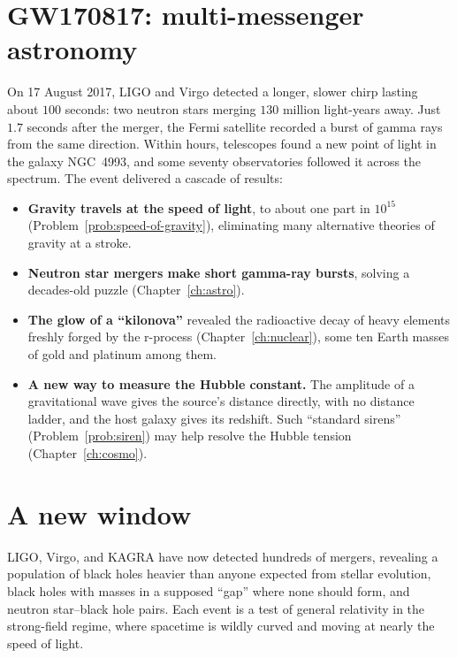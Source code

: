 \section{GW170817: multi-messenger astronomy}

On 17 August 2017, LIGO and Virgo detected a longer, slower chirp lasting about $100$ seconds: two neutron stars merging $130$ million light-years away. Just $1.7$ seconds after the merger, the Fermi satellite recorded a burst of gamma rays from the same direction. Within hours, telescopes found a new point of light in the galaxy NGC~4993, and some seventy observatories followed it across the spectrum. The event delivered a cascade of results:
\begin{itemize}[itemsep=3pt]
  \item \textbf{Gravity travels at the speed of light}, to about one part in $10^{15}$ (Problem~\ref{prob:speed-of-gravity}), eliminating many alternative theories of gravity at a stroke.
  \item \textbf{Neutron star mergers make short gamma-ray bursts}, solving a decades-old puzzle (Chapter~\ref{ch:astro}).
  \item \textbf{The glow of a ``kilonova''} revealed the radioactive decay of heavy elements freshly forged by the r-process (Chapter~\ref{ch:nuclear}), some ten Earth masses of gold and platinum among them.
  \item \textbf{A new way to measure the Hubble constant.} The amplitude of a gravitational wave gives the source's distance directly, with no distance ladder, and the host galaxy gives its redshift. Such ``standard sirens'' (Problem~\ref{prob:siren}) may help resolve the Hubble tension (Chapter~\ref{ch:cosmo}).
\end{itemize}

\section{A new window}

LIGO, Virgo, and KAGRA have now detected hundreds of mergers, revealing a population of black holes heavier than anyone expected from stellar evolution, black holes with masses in a supposed ``gap'' where none should form, and neutron star--black hole pairs. Each event is a test of general relativity in the strong-field regime, where spacetime is wildly curved and moving at nearly the speed of light.


